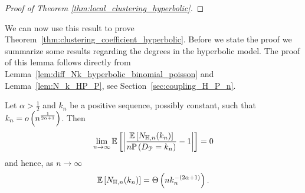 \begin{proof}[Proof of Theorem \ref{thm:local_clustering_hyperbolic}]

\end{proof}

We can now use this result to prove Theorem~\ref{thm:clustering_coefficient_hyperbolic}. Before we state the proof we summarize some results regarding the degrees in the hyperbolic model. The proof of this lemma follows directly from Lemma~\ref{lem:diff_Nk_hyperbolic_binomial_poisson} and Lemma~\ref{lem:N_k_HP_P}, see Section~\ref{sec:coupling_H_P_n}.

\begin{lemma}\label{lem:N_k_H_P}
Let $\alpha > \frac{1}{2}$ and $k_n$ be a positive sequence, possibly constant, such that $k_n = o\left(n^{\frac{1}{2\alpha + 1}}\right)$. Then
\[
	\lim_{n\to \infty} \mathbb{E}\left[\left|\frac{\mathbb{E}\left[N_{\mathbb{H},n}(k_n)\right]}{n \mathbb{P}\left(D_{{\mathcal P}} = k_n\right)} - 1\right|\right] = 0
\]
and hence, as $n \to \infty$
\[
	\mathbb{E}\left[N_{\mathbb{H},n}(k_n)\right] = \Theta\left(n k_n^{-(2\alpha + 1)}\right).
\]
\end{lemma}

